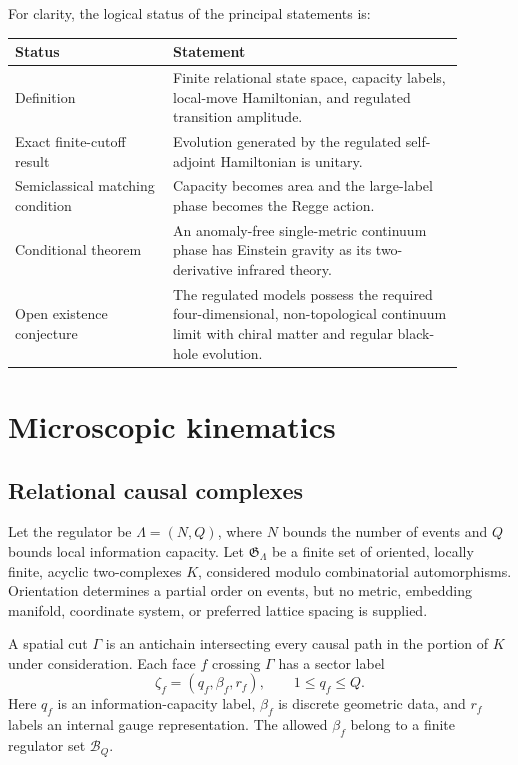 \documentclass[11pt]{article}
\theoremstyle{remark}
\begin{document}
For clarity, the logical status of the principal statements is:
\begin{center}
\begin{tabular}{p{0.31\linewidth}p{0.58\linewidth}}
\toprule
\textbf{Status} & \textbf{Statement}\\
\midrule
Definition &
Finite relational state space, capacity labels, local-move Hamiltonian,
and regulated transition amplitude.\\
Exact finite-cutoff result &
Evolution generated by the regulated self-adjoint Hamiltonian is unitary.\\
Semiclassical matching condition &
Capacity becomes area and the large-label phase becomes the Regge action.\\
Conditional theorem &
An anomaly-free single-metric continuum phase has Einstein gravity as its
two-derivative infrared theory.\\
Open existence conjecture &
The regulated models possess the required four-dimensional,
non-topological continuum limit with chiral matter and regular black-hole
evolution.\\
\bottomrule
\end{tabular}
\end{center}

\section{Microscopic kinematics}

\subsection{Relational causal complexes}

Let the regulator be \(\Lambda=(N,Q)\), where \(N\) bounds the number of
events and \(Q\) bounds local information capacity.  Let
\(\mathfrak G_\Lambda\) be a finite set of oriented, locally finite,
acyclic two-complexes \(K\), considered modulo combinatorial
automorphisms.  Orientation determines a partial order on events, but no
metric, embedding manifold, coordinate system, or preferred lattice
spacing is supplied.

A spatial cut \(\Gamma\) is an antichain intersecting every causal path in
the portion of \(K\) under consideration.  Each face \(f\) crossing
\(\Gamma\) has a sector label
\begin{equation}
  \zeta_f=(q_f,\beta_f,r_f), \qquad
  1\le q_f\le Q.
\end{equation}
Here \(q_f\) is an information-capacity label, \(\beta_f\) is discrete
geometric data, and \(r_f\) labels an internal gauge representation.
The allowed \(\beta_f\) belong to a finite regulator set
\(\mathcal B_Q\).
\end{document}
